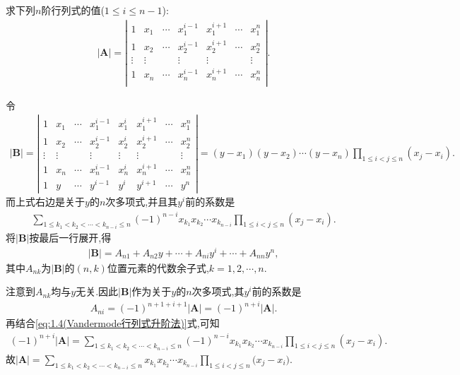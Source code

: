 \documentclass[../../main.tex]{subfiles}%
\begin{document}
\begin{example}\label{升阶法的应用(2)例题}
求下列$n$阶行列式的值($1\leqslant i\leqslant n-1$):
\begin{align*}
|\boldsymbol{A}|=\left| \begin{matrix}
1&		x_1&		\cdots&		x_{1}^{i-1}&		x_{1}^{i+1}&		\cdots&		x_{1}^{n}\\
1&		x_2&		\cdots&		x_{2}^{i-1}&		x_{2}^{i+1}&		\cdots&		x_{2}^{n}\\
\vdots&		\vdots&		&		\vdots&		\vdots&		&		\vdots\\
1&		x_n&		\cdots&		x_{n}^{i-1}&		x_{n}^{i+1}&		\cdots&		x_{n}^{n}\\
\end{matrix} \right|.
\end{align*}
\end{example}
\begin{solution}
令
\begin{align*}
|\boldsymbol{B}|=\left|\begin{matrix}
1 & x_1 & \cdots & x_{1}^{i - 1} & x_{1}^{i} & x_{1}^{i + 1} & \cdots & x_{1}^{n}\\
1 & x_2 & \cdots & x_{2}^{i - 1} & x_{2}^{i} & x_{2}^{i + 1} & \cdots & x_{2}^{n}\\
\vdots & \vdots &  & \vdots & \vdots & \vdots &  & \vdots\\
1 & x_n & \cdots & x_{n}^{i - 1} & x_{n}^{i} & x_{n}^{i + 1} & \cdots & x_{n}^{n}\\
1 & y & \cdots & y^{i - 1} & y^i & y^{i + 1} & \cdots & y^n
\end{matrix}\right|=(y - x_1)(y - x_2)\cdots (y - x_n)\prod_{1\leqslant i < j\leqslant n}(x_j - x_i).
\end{align*}
而上式右边是关于\(y\)的\(n\)次多项式,并且其\(y^i\)前的系数是
\begin{align}\label{eq:1.4(Vandermode行列式升阶法)}
\sum_{1\leqslant k_1 < k_2 < \cdots < k_{n - i}\leqslant n}(-1)^{n - i}x_{k_1}x_{k_2}\cdots x_{k_{n - i}}\prod_{1\leqslant i < j\leqslant n}(x_j - x_i).
\end{align}
将\(|\boldsymbol{B}|\)按最后一行展开,得
\begin{align*}
|\boldsymbol{B}|=A_{n1} + A_{n2}y + \cdots + A_{ni}y^i + \cdots + A_{nn}y^n, 
\end{align*}
其中\(A_{nk}\)为\(|\boldsymbol{B}|\)的\((n,k)\)位置元素的代数余子式,\(k = 1,2,\cdots,n\).

注意到\(A_{nk}\)均与\(y\)无关.因此\(|\boldsymbol{B}|\)作为关于\(y\)的\(n\)次多项式,其\(y^i\)前的系数是
\begin{align*}
A_{ni}=(-1)^{n + 1 + i + 1}|\boldsymbol{A}|=(-1)^{n + i}|\boldsymbol{A}|.
\end{align*}
再结合\eqref{eq:1.4(Vandermode行列式升阶法)}式,可知
\begin{align*}
(-1)^{n + i}|\boldsymbol{A}|=\sum_{1\leqslant k_1 < k_2 < \cdots < k_{n - i}\leqslant n}(-1)^{n - i}x_{k_1}x_{k_2}\cdots x_{k_{n - i}}\prod_{1\leqslant i < j\leqslant n}(x_j - x_i). 
\end{align*}
故\(|\boldsymbol{A}|=\sum_{1\leqslant k_1<k_2<\cdots <k_{n-i}\leqslant n}{x_{k_1}x_{k_2}\cdots x_{k_{n-i}}\prod_{1\leqslant i<j\leqslant n}{(x_j}-x_i)}\).

\end{solution}
\end{document}
